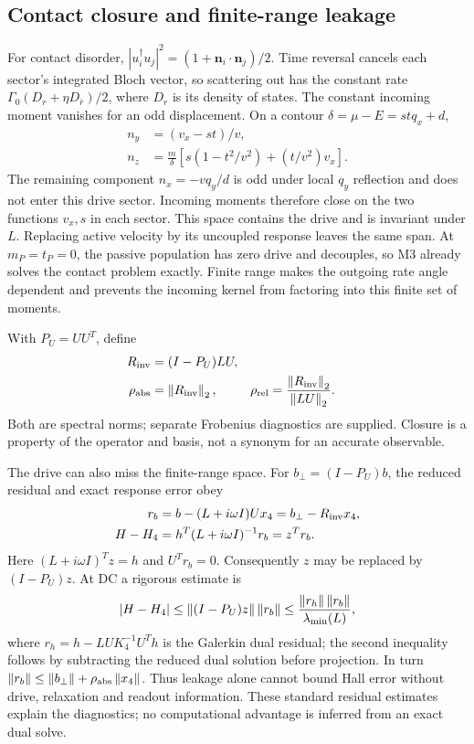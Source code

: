 \subsection{Contact closure and finite-range leakage}
For contact disorder, $|u_i^\dagger u_j|^2=(1+\bm n_i\cdot\bm n_j)/2$. Time reversal cancels each sector's integrated Bloch vector, so scattering out has the constant rate $\Gamma_0(D_r+\eta D_{\bar r})/2$, where $D_r$ is its density of states. The constant incoming moment vanishes for an odd displacement. On a contour $\delta=\mu-E=stq_x+d$,
\begin{align}
n_y&=(v_x-st)/v,\\
n_z&=\frac m\delta\left[s(1-t^2/v^2)+(t/v^2)v_x\right].\label{eq:closure}
\end{align}
The remaining component $n_x=-vq_y/d$ is odd under local $q_y$ reflection and does not enter this drive sector. Incoming moments therefore close on the two functions $v_x,s$ in each sector. This space contains the drive and is invariant under $L$. Replacing active velocity by its uncoupled response leaves the same span. At $m_P=t_P=0$, the passive population has zero drive and decouples, so M3 already solves the contact problem exactly. Finite range makes the outgoing rate angle dependent and prevents the incoming kernel from factoring into this finite set of moments.

With $P_U=UU^T$, define
\begin{align}
R_{\rm inv}&=(I-P_U)LU,\\
\rho_{\rm abs}&=\left\lVert R_{\rm inv}\right\rVert_2,&
\rho_{\rm rel}&=\frac{\left\lVert R_{\rm inv}\right\rVert_2}{\left\lVert LU\right\rVert_2}.\label{eq:leak}
\end{align}
Both are spectral norms; separate Frobenius diagnostics are supplied. Closure is a property of the operator and basis, not a synonym for an accurate observable.

The drive can also miss the finite-range space. For $b_\perp=(I-P_U)b$, the reduced residual and exact response error obey
\begin{align}
r_b&=b-(L+i\omega I)Ux_4=b_\perp-R_{\rm inv}x_4,\\
H-H_4&=h^T(L+i\omega I)^{-1}r_b=z^Tr_b.\label{eq:projectionerror}
\end{align}
Here $(L+i\omega I)^Tz=h$ and $U^Tr_b=0$. Consequently $z$ may be replaced by $(I-P_U)z$. At DC a rigorous estimate is
\begin{equation}
|H-H_4|\leq\left\lVert(I-P_U)z\right\rVert\left\lVert r_b\right\rVert
\leq\frac{\left\lVert r_h\right\rVert\left\lVert r_b\right\rVert}{\lambda_{\min}(L)},\label{eq:dualbound}
\end{equation}
where $r_h=h-LU K_4^{-1}U^Th$ is the Galerkin dual residual; the second inequality follows by subtracting the reduced dual solution before projection. In turn $\left\lVert r_b\right\rVert\leq\left\lVert b_\perp\right\rVert+\rho_{\rm abs}\left\lVert x_4\right\rVert$. Thus leakage alone cannot bound Hall error without drive, relaxation and readout information. These standard residual estimates explain the diagnostics; no computational advantage is inferred from an exact dual solve.

